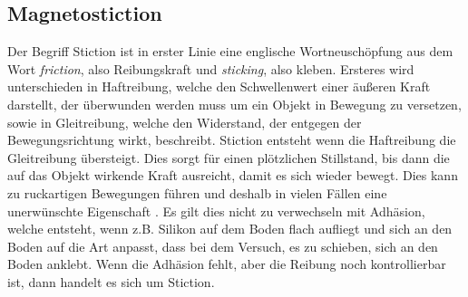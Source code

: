 \subsection{Magnetostiction}

Der Begriff Stiction ist in erster Linie eine englische Wortneuschöpfung aus dem Wort \textit{friction}, also Reibungskraft und \textit{sticking}, also kleben. Ersteres wird unterschieden in Haftreibung, welche den Schwellenwert einer äußeren Kraft darstellt, der überwunden werden muss um ein Objekt in Bewegung zu versetzen, sowie in Gleitreibung, welche den Widerstand, der entgegen der Bewegungsrichtung wirkt, beschreibt. Stiction entsteht wenn die Haftreibung die Gleitreibung übersteigt. Dies sorgt für einen plötzlichen Stillstand, bis dann die auf das Objekt wirkende Kraft ausreicht, damit es sich wieder bewegt. Dies kann zu ruckartigen Bewegungen führen und deshalb in vielen Fällen eine unerwünschte Eigenschaft \cite{Ruel2014STICTIONT}. Es gilt dies nicht zu verwechseln mit Adhäsion, welche entsteht, wenn z.B. Silikon auf dem Boden flach aufliegt und sich an den Boden auf die Art anpasst, dass bei dem Versuch, es zu schieben, sich an den Boden anklebt. Wenn die Adhäsion fehlt, aber die Reibung noch kontrollierbar ist, dann handelt es sich um Stiction. \cite{Monkman_2019}


	
